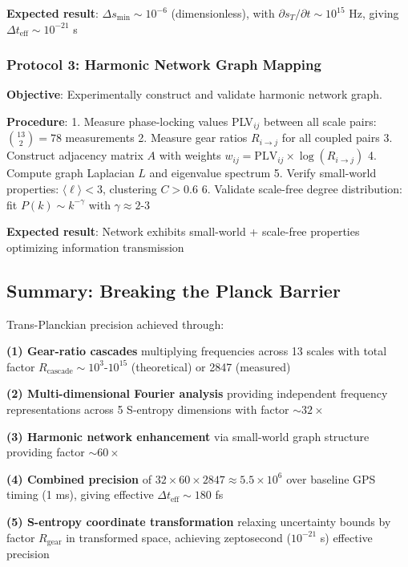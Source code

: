 \documentclass[11pt,onecolumn]{article}
\begin{document}
\textbf{Expected result}: $\Delta s_{\min} \sim 10^{-6}$ (dimensionless), with $\partial s_T/\partial t \sim 10^{15}$ Hz, giving $\Delta t_{\text{eff}} \sim 10^{-21}$ s

\subsubsection{Protocol 3: Harmonic Network Graph Mapping}

\textbf{Objective}: Experimentally construct and validate harmonic network graph.

\textbf{Procedure}:
1. Measure phase-locking values PLV$_{ij}$ between all scale pairs: $\binom{13}{2} = 78$ measurements
2. Measure gear ratios $R_{i \to j}$ for all coupled pairs
3. Construct adjacency matrix $A$ with weights $w_{ij} = \text{PLV}_{ij} \times \log(R_{i \to j})$
4. Compute graph Laplacian $L$ and eigenvalue spectrum
5. Verify small-world properties: $\langle \ell \rangle < 3$, clustering $C > 0.6$
6. Validate scale-free degree distribution: fit $P(k) \sim k^{-\gamma}$ with $\gamma \approx 2$-3

\textbf{Expected result}: Network exhibits small-world + scale-free properties optimizing information transmission

\subsection{Summary: Breaking the Planck Barrier}

Trans-Planckian precision achieved through:

\textbf{(1) Gear-ratio cascades} multiplying frequencies across 13 scales with total factor $R_{\text{cascade}} \sim 10^3$-$10^{15}$ (theoretical) or 2847 (measured)

\textbf{(2) Multi-dimensional Fourier analysis} providing independent frequency representations across 5 S-entropy dimensions with factor $\sim 32\times$

\textbf{(3) Harmonic network enhancement} via small-world graph structure providing factor $\sim 60\times$

\textbf{(4) Combined precision} of $32 \times 60 \times 2847 \approx 5.5 \times 10^6$ over baseline GPS timing (1 ms), giving effective $\Delta t_{\text{eff}} \sim 180$ fs

\textbf{(5) S-entropy coordinate transformation} relaxing uncertainty bounds by factor $R_{\text{gear}}$ in transformed space, achieving zeptosecond ($10^{-21}$ s) effective precision
\end{document}
